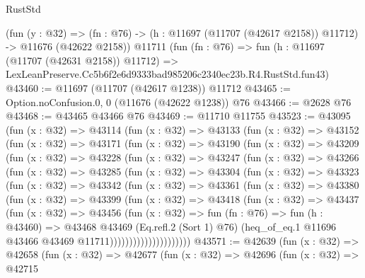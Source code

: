 \begin{lexlean}{RustStd}
\begin{coremodule}
    (fun (y : @32) =>
    (fn : @76) -> (h : @11697 (@11707 (@42617 @2158)) @11712) -> @11676 (@42622 @2158))
    @11711
    (fun (fn : @76) =>
    fun (h : @11697 (@11707 (@42631 @2158)) @11712) =>
    LexLeanPreserve.Cc5b6f2e6d9333bad985206c2340ec23b.R4.RustStd.fun43)
@43460 := @11697 (@11707 (@42617 @1238)) @11712
@43465 := Option.noConfusion.{0, 0} (@11676 (@42622 @1238)) @76
@43466 := @2628 @76
@43468 := @43465 @43466 @76
@43469 := @11710 @11755
@43523 := @43095
    (fun (x : @32) =>
    @43114
      (fun (x : @32) =>
      @43133
        (fun (x : @32) =>
        @43152
          (fun (x : @32) =>
          @43171
            (fun (x : @32) =>
            @43190
              (fun (x : @32) =>
              @43209
                (fun (x : @32) =>
                @43228
                  (fun (x : @32) =>
                  @43247
                    (fun (x : @32) =>
                    @43266
                      (fun (x : @32) =>
                      @43285
                        (fun (x : @32) =>
                        @43304
                          (fun (x : @32) =>
                          @43323
                            (fun (x : @32) =>
                            @43342
                              (fun (x : @32) =>
                              @43361
                                (fun (x : @32) =>
                                @43380
                                  (fun (x : @32) =>
                                  @43399
                                    (fun (x : @32) =>
                                    @43418
                                      (fun (x : @32) =>
                                      @43437
                                        (fun (x : @32) =>
                                        @43456
                                          (fun (x : @32) =>
                                          fun (fn : @76) =>
                                          fun (h : @43460) =>
                                          @43468
                                            @43469
                                            (Eq.refl.{2} (Sort 1) @76)
                                            (heq_of_eq.{1}
                                              @11696
                                              @43466
                                              @43469
                                              @11711)))))))))))))))))))))
@43571 := @42639
    (fun (x : @32) =>
    @42658
      (fun (x : @32) =>
      @42677
        (fun (x : @32) =>
        @42696
          (fun (x : @32) =>
          @42715

\end{coremodule}
\end{lexlean}
